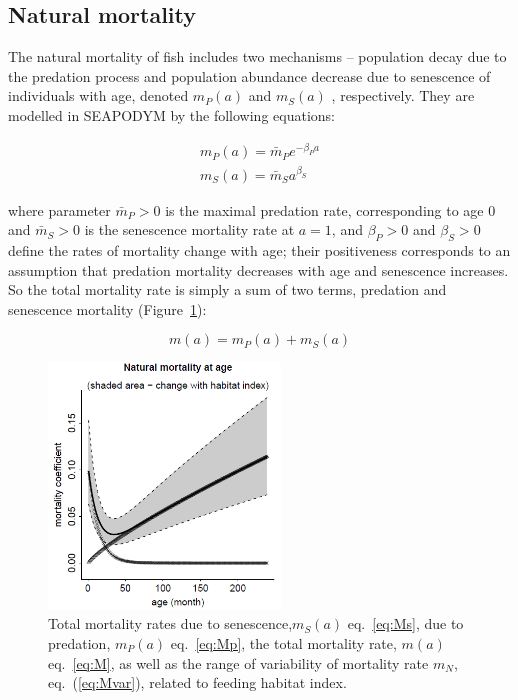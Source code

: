 \subsection{Natural mortality}\label{sec:natural-mortality}

The natural mortality of fish includes two mechanisms --  population decay due to the predation process and population abundance decrease due to senescence of individuals with age, denoted $m_P(a)$ and  $m_S(a)$ , respectively. They are modelled in SEAPODYM by the following equations:

\begin{align}
	m_P(a) = \bar{m}_P e^{-\beta_P a} \label{eq:Mp}\\
	m_S(a)  = \bar{m}_S a^{\beta_S} \label{eq:Ms}
\end{align}
	
\noindent where parameter $\bar{m}_P>0$ is the maximal predation rate, corresponding to age 0 and $\bar{m}_S>0$ is the senescence mortality rate at $a=1$, and $\beta_P>0$ and $\beta_S>0$ define the rates of mortality change with age; their positiveness corresponds to an assumption that predation mortality decreases with age and senescence increases. So the total mortality rate is simply a sum of two terms, predation and senescence mortality (Figure~\ref{fig:mean-mortality}):

\begin{equation}
m(a) = m_P(a)+m_S(a)
\label{eq:M}
\end{equation}

\begin{figure}[htbp]
  \centering
  \includegraphics[width=0.55\textwidth]{chapter1/figs/mortality-func}
  \caption{Total mortality rates due to senescence,$m_S(a)$ eq.~\eqref{eq:Ms}, due to predation, $m_P(a)$ eq.~\eqref{eq:Mp}, the total mortality rate, $m(a)$ eq.~\eqref{eq:M}, as well as the range of variability of mortality rate $m_N$, eq.~(\ref{eq:Mvar}), related to feeding habitat index.}
  \label{fig:mean-mortality}
\end{figure}

